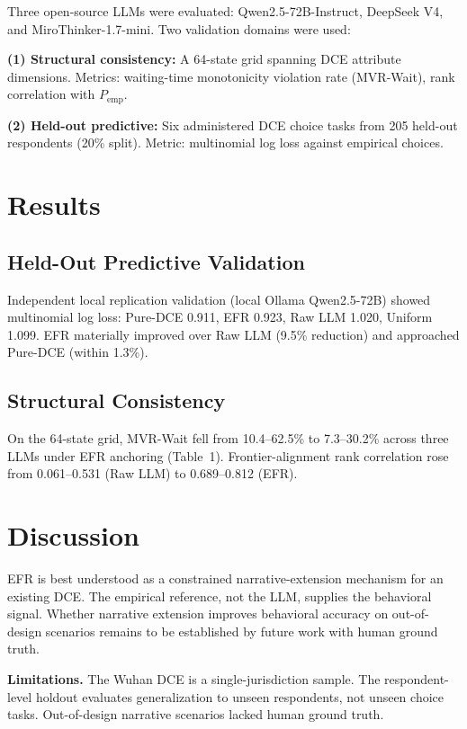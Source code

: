 \documentclass[12pt]{article}
\begin{document}
Three open-source LLMs were evaluated: Qwen2.5-72B-Instruct, DeepSeek V4, and MiroThinker-1.7-mini. Two validation domains were used:

\textbf{(1) Structural consistency:} A 64-state grid spanning DCE attribute dimensions. Metrics: waiting-time monotonicity violation rate (MVR-Wait), rank correlation with $P_{\text{emp}}$.

\textbf{(2) Held-out predictive:} Six administered DCE choice tasks from 205 held-out respondents (20\% split). Metric: multinomial log loss against empirical choices.

\section{Results}
\label{sec:results}

\subsection{Held-Out Predictive Validation}

Independent local replication validation (local Ollama Qwen2.5-72B) showed multinomial log loss: Pure-DCE 0.911, EFR 0.923, Raw LLM 1.020, Uniform 1.099. EFR materially improved over Raw LLM (9.5\% reduction) and approached Pure-DCE (within 1.3\%).

\subsection{Structural Consistency}

On the 64-state grid, MVR-Wait fell from 10.4--62.5\% to 7.3--30.2\% across three LLMs under EFR anchoring (Table~1). Frontier-alignment rank correlation rose from 0.061--0.531 (Raw LLM) to 0.689--0.812 (EFR).

\section{Discussion}
\label{sec:discussion}

EFR is best understood as a constrained narrative-extension mechanism for an existing DCE. The empirical reference, not the LLM, supplies the behavioral signal. Whether narrative extension improves behavioral accuracy on out-of-design scenarios remains to be established by future work with human ground truth.

\textbf{Limitations.} The Wuhan DCE is a single-jurisdiction sample. The respondent-level holdout evaluates generalization to unseen respondents, not unseen choice tasks. Out-of-design narrative scenarios lacked human ground truth.
\end{document}
